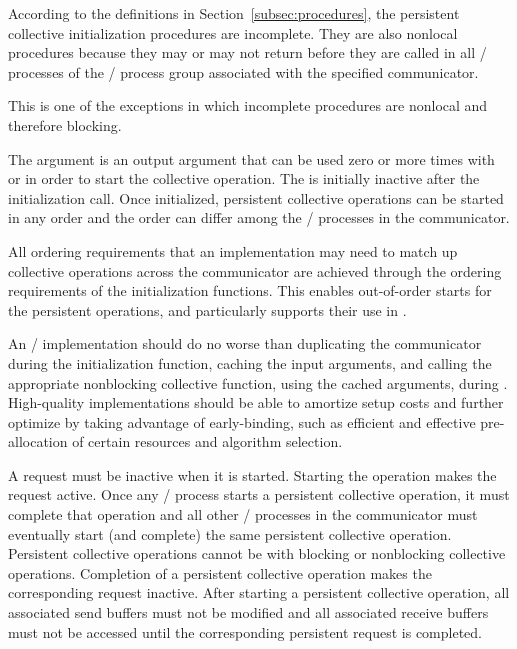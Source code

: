 According to the definitions in Section~\ref{subsec:procedures},
the persistent collective initialization procedures are incomplete.
They are also nonlocal procedures because they may or may not return
before they are called in all \MPI/ processes of the \MPI/ process group
associated with the specified communicator.
\begin{users}
This is one of the exceptions in which incomplete procedures are nonlocal and therefore blocking.
\end{users}

The  argument is an output argument
that can be used zero or more times
with  or 
in order to start the collective operation.
The  is initially inactive after the initialization call.
%
Once initialized,
persistent collective operations can be started in any order
and the order can differ among the \MPI/ processes in the communicator.

\begin{rationale}
All ordering requirements that an implementation may need to match up collective operations across the communicator
are achieved through the ordering requirements of the initialization functions.  This enables out-of-order starts
for the persistent operations, and particularly supports their use in .
\end{rationale}

\begin{implementors}
An \MPI/ implementation should do no worse than duplicating the communicator during the initialization function,
caching the input arguments, and
calling the appropriate nonblocking collective function, using the cached arguments, during .
High-quality implementations should be able to amortize setup costs and further optimize by taking advantage of early-binding,
such as efficient and effective pre-allocation of certain resources and algorithm selection.
\end{implementors}

A request must be inactive when it is started.
Starting the operation makes the request active.
%
Once any \MPI/ process starts a persistent collective operation,
it must complete that operation
and
all other \MPI/ processes in the communicator must eventually
start (and complete) the same persistent collective operation.
%
Persistent collective operations cannot be
 with blocking or nonblocking collective operations.
Completion of a persistent collective operation makes the corresponding request inactive.
%
After starting a persistent collective operation, all associated
send buffers must not be modified and all associated receive buffers
must not be accessed until the corresponding persistent request is
completed.

